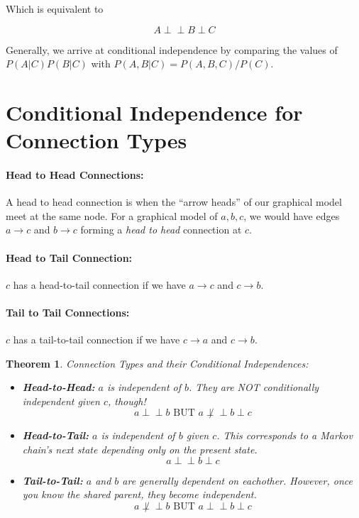 \documentclass[a4paper,12pt]{report}
\newtheorem{theorem}{Theorem}
\begin{document}
Which is equivalent to 

\newcommand\ci{\perp\!\!\!\perp}

\begin{equation}
A \ci B \perp C
\end{equation}

Generally, we arrive at conditional independence by comparing the values of $P(A|C)P(B|C)$ with $P(A,B|C) = P(A,B,C)/P(C)$.


\section{Conditional Independence for Connection Types}

\paragraph{Head to Head Connections: } A head to head connection is when the ``arrow heads'' of our graphical model meet at the same node. For a graphical model of $a,b,c$, we would have edges $a\to c$ and $b\to c$ forming a \textit{head to head} connection at $c$.


\paragraph{Head to Tail Connection: } $c$ has a head-to-tail connection if we have $a\to c$ and $c\to b$. 

\paragraph{Tail to Tail Connections: } $c$ has a tail-to-tail connection if we have $c\to a$ and $c \to b$.


\begin{theorem}{Connection Types and their Conditional Independences: }
\begin{itemize}
\item \textbf{Head-to-Head:} $a$ is independent of $b$. They are NOT conditionally independent given $c$, though!
\begin{equation}
a \ci b \text{ BUT } a \not\ci b \perp c
\end{equation}

\item \textbf{Head-to-Tail:} $a$ is independent of $b$ given $c$. This corresponds to a Markov chain's next state depending only on the present state. 
\begin{equation}
a \ci b \perp c
\end{equation}

\item \textbf{Tail-to-Tail:} $a$ and $b$ are generally dependent on eachother. However, once you know the shared parent, they become \textit{independent}.
\begin{equation}
a \not \ci b \text{ BUT } a \ci b \perp c
\end{equation}
\end{itemize}
\end{theorem}
\end{document}
